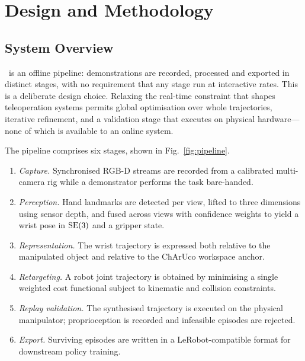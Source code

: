 \chapter{Design and Methodology}
\label{ch:method}

\section{System Overview}
\label{sec:overview}

\viki\ is an offline pipeline: demonstrations are recorded, processed and
exported in distinct stages, with no requirement that any stage run at
interactive rates. This is a deliberate design choice. Relaxing the real-time
constraint that shapes teleoperation systems permits global optimisation over
whole trajectories, iterative refinement, and a validation stage that executes
on physical hardware---none of which is available to an online system.

The pipeline comprises six stages, shown in Fig.~\ref{fig:pipeline}.

\begin{enumerate}[leftmargin=2em]
  \item \emph{Capture.} Synchronised RGB-D streams are recorded from a
        calibrated multi-camera rig while a demonstrator performs the task
        bare-handed.
  \item \emph{Perception.} Hand landmarks are detected per view, lifted to
        three dimensions using sensor depth, and fused across views with
        confidence weights to yield a wrist pose in $\mathrm{SE}(3)$ and a gripper state.
  \item \emph{Representation.} The wrist trajectory is expressed both relative
        to the manipulated object and relative to the ChArUco workspace anchor.
  \item \emph{Retargeting.} A robot joint trajectory is obtained by minimising
        a single weighted cost functional subject to kinematic and collision
        constraints.
  \item \emph{Replay validation.} The synthesised trajectory is executed on the
        physical manipulator; proprioception is recorded and infeasible
        episodes are rejected.
  \item \emph{Export.} Surviving episodes are written in a LeRobot-compatible
        format for downstream policy training.
\end{enumerate}

